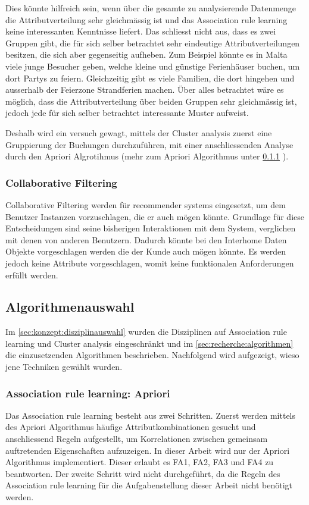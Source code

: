 Dies könnte hilfreich sein, wenn über die gesamte zu analysierende Datenmenge die Attributverteilung sehr gleichmässig ist und das Association rule learning keine interessanten Kenntnisse liefert. Das schliesst nicht aus, dass es zwei Gruppen gibt, die für sich selber betrachtet sehr eindeutige Attributverteilungen besitzen, die sich aber gegenseitig aufheben. Zum Beispiel könnte es in Malta viele junge Besucher geben, welche kleine und günstige Ferienhäuser buchen, um dort Partys zu feiern. Gleichzeitig gibt es viele Familien, die dort hingehen und ausserhalb der Feierzone Strandferien machen. Über alles betrachtet wäre es möglich, dass die Attributverteilung über beiden Gruppen sehr gleichmässig ist, jedoch jede für sich selber betrachtet interessante Muster aufweist.

Deshalb wird ein versuch gewagt, mittels der Cluster analysis zuerst eine Gruppierung der Buchungen durchzuführen, mit einer anschliessenden Analyse durch den Apriori Algrotihmus (mehr zum Apriori Algorithmus unter \cref{sec:konzept:algorithmenauswahl:apriori} ).

\subsubsection{Collaborative Filtering}
\label{sec:konzept:disziplinauswahl:collaborativefiltering}
Collaborative Filtering werden für recommender systems eingesetzt, um dem Benutzer Instanzen vorzuschlagen, die er auch mögen könnte. Grundlage für diese Entscheidungen sind seine bisherigen Interaktionen mit dem System, verglichen mit denen von anderen Benutzern. Dadurch könnte bei den Interhome Daten Objekte vorgeschlagen werden die der Kunde auch mögen könnte. Es werden jedoch keine Attribute vorgeschlagen, womit keine funktionalen Anforderungen erfüllt werden.

\subsection{Algorithmenauswahl}
\label{sec:konzept:algorithmenauswahl}
Im \cref{sec:konzept:disziplinauswahl} wurden die Disziplinen auf Association rule learning und Cluster analysis eingeschränkt und im \cref{sec:recherche:algorithmen} die einzusetzenden Algorithmen beschrieben. Nachfolgend wird aufgezeigt, wieso jene Techniken gewählt wurden.

\subsubsection{Association rule learning: Apriori}
\label{sec:konzept:algorithmenauswahl:apriori}
Das Association rule learning besteht aus zwei Schritten. Zuerst werden mittels des Apriori Algorithmus häufige Attributkombinationen gesucht und anschliessend Regeln aufgestellt, um Korrelationen zwischen gemeinsam auftretenden Eigenschaften aufzuzeigen.
In dieser Arbeit wird nur der Apriori Algorithmus implementiert. Dieser erlaubt es FA1, FA2, FA3 und FA4 zu beantworten. Der zweite Schritt wird nicht durchgeführt, da die Regeln des Association rule learning für die Aufgabenstellung dieser Arbeit nicht benötigt werden.

